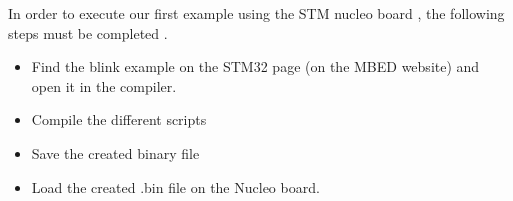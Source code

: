 \documentclass[a4paper, 11pt, openany, oneside]{book}
\newcommand{\inputmintedcpp}[1]{
\inputminted[style=fruity,%
             linenos=true,
             firstnumber=1,
             bgcolor=black, %
]
{cpp}
{#1}
}
\begin{document}
In order to execute our first example using the STM nucleo board , the following steps must be completed .



\begin{itemize}
    \item Find the blink example on the STM32 page (on the MBED website) and open it in the compiler. 
    \item Compile the different scripts 
    \item Save the created binary file
    \item Load the created .bin file on the Nucleo board.
\end{itemize}
\newpage




\end{document}
